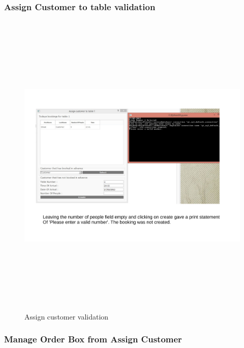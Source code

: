 \begin{landscape}

\subsubsection{Assign Customer to table validation}

\begin{figure}[H]
    \includegraphics[height = 15cm]{./Testing/images/test4.pdf}
    \caption{Assign customer validation} \label{fig:Test4}
\end{figure}

\subsubsection{Manage Order Box from Assign Customer}


\end{landscape}
